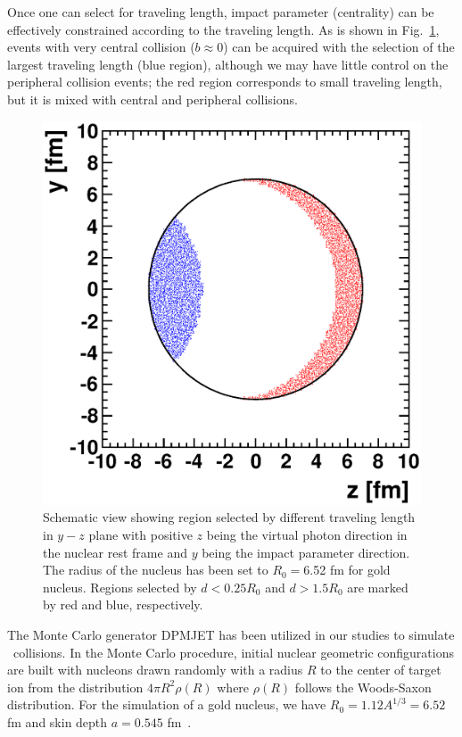 Once one can select for traveling length, impact parameter (centrality)
can be effectively constrained according to the traveling length. As is shown
in Fig.~\ref{fig:distBimp}, events with very central collision ($b\approx 0$)
can be acquired with the selection of the largest traveling length (blue
region), although we may have little control on the peripheral collision
events; the red region corresponds to small traveling length, but it
is mixed with central and peripheral collisions.
\begin{figure}[hbt]
\begin{center}
\includegraphics[width=0.55\columnwidth]{plots/chpt7/distance_to_bimpact_contour.eps}
\caption[Region selected by traveling distance] {Schematic view showing region selected by different traveling length in $y-z$ plane with
positive $z$ being the virtual photon direction in the nuclear rest frame and $y$ being
the impact parameter direction. The radius of the nucleus has been set to $R_{0}=$6.52 fm for gold nucleus. Regions selected by $d<0.25R_{0}$
and $d>1.5R_{0}$ are marked by red and blue, respectively.}
\label{fig:distBimp}
\end{center}
\end{figure}


The Monte Carlo generator DPMJET has been utilized in our studies to simulate
\eA\ collisions. In the Monte Carlo procedure,
initial nuclear geometric configurations are built with nucleons drawn randomly
with a radius $R$ to the center of target ion from the distribution $4\pi
R^{2}\rho(R)$ where $\rho(R)$ follows the Woods-Saxon distribution. For the
simulation of a gold nucleus, we have $R_{0}=1.12A^{1/3}=6.52$ fm and skin
depth $a=0.545$ fm~\cite{Engel:1996yb}.



